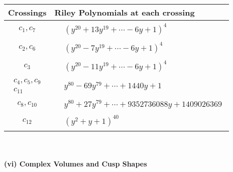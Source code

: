 \documentclass[1p]{elsarticle_modified}
\theoremstyle{definition}
\begin{document}
\begin{tabular}{m{50pt}|m{274pt}}
Crossings & \hspace{64pt}Riley Polynomials at each crossing \\
\hline $$\begin{aligned}c_{1},c_{7}\end{aligned}$$&$\begin{aligned}
&(y^{20}+13 y^{19}+\cdots-6 y+1)^{4}
\end{aligned}$\\
\hline $$\begin{aligned}c_{2},c_{6}\end{aligned}$$&$\begin{aligned}
&(y^{20}-7 y^{19}+\cdots-6 y+1)^{4}
\end{aligned}$\\
\hline $$\begin{aligned}c_{3}\end{aligned}$$&$\begin{aligned}
&(y^{20}-11 y^{19}+\cdots-6 y+1)^{4}
\end{aligned}$\\
\hline $$\begin{aligned}c_{4},c_{5},c_{9}\\c_{11}\end{aligned}$$&$\begin{aligned}
&y^{80}-69 y^{79}+\cdots+1440 y+1
\end{aligned}$\\
\hline $$\begin{aligned}c_{8},c_{10}\end{aligned}$$&$\begin{aligned}
&y^{80}+27 y^{79}+\cdots+9352736088 y+1409026369
\end{aligned}$\\
\hline $$\begin{aligned}c_{12}\end{aligned}$$&$\begin{aligned}
&(y^2+y+1)^{40}
\end{aligned}$\\
\hline
\end{tabular}\\~\\
\newpage\flushleft \textbf{(vi) Complex Volumes and Cusp Shapes}
\end{document}
